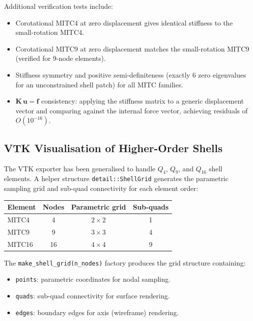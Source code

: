 Additional verification tests include:
\begin{itemize}
  \item Corotational MITC4 at zero displacement gives identical
        stiffness to the small-rotation MITC4.
  \item Corotational MITC9 at zero displacement matches the
        small-rotation MITC9 (verified for 9-node elements).
  \item Stiffness symmetry and positive semi-definiteness
        (exactly 6 zero eigenvalues for an unconstrained shell
        patch) for all MITC families.
  \item $\mathbf{K}\,\mathbf{u} = \mathbf{f}$ consistency:
        applying the stiffness matrix to a generic displacement
        vector and comparing against the internal force vector,
        achieving residuals of $O(10^{-16})$.
\end{itemize}

\subsection{VTK Visualisation of Higher-Order Shells}
\label{sec:vtk-shells}

The VTK exporter has been generalised to handle $Q_4$, $Q_9$,
and $Q_{16}$ shell elements.  A helper structure
\texttt{detail::ShellGrid} generates the parametric sampling
grid and sub-quad connectivity for each element order:

\begin{center}
\begin{tabular}{l c c c}
  \toprule
  Element  & Nodes & Parametric grid & Sub-quads \\
  \midrule
  MITC4    & 4     & $2 \times 2$    & 1         \\
  MITC9    & 9     & $3 \times 3$    & 4         \\
  MITC16   & 16    & $4 \times 4$    & 9         \\
  \bottomrule
\end{tabular}
\end{center}

The \texttt{make\_shell\_grid(n\_nodes)} factory produces the
grid structure containing:
\begin{itemize}
  \item \texttt{points}: parametric coordinates for nodal sampling.
  \item \texttt{quads}: sub-quad connectivity for surface rendering.
  \item \texttt{edges}: boundary edges for axis (wireframe)
        rendering.
\end{itemize}

